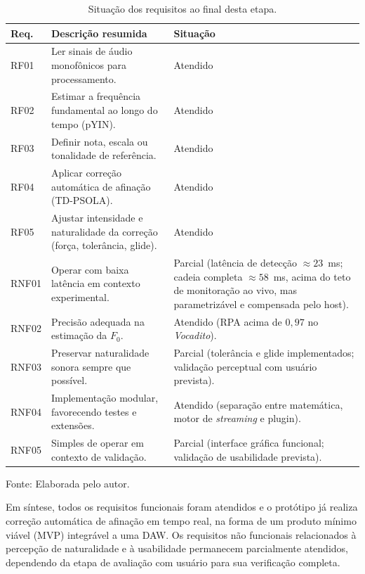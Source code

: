 \begin{table}[H]
\centering
\caption{\label{tab:requisitos_atingidos}Situação dos requisitos ao final desta etapa.}
\small
\begin{tabular}{|p{1.6cm}|p{8.4cm}|p{3.4cm}|}
\hline
\textbf{Req.} & \textbf{Descrição resumida} & \textbf{Situação} \\
\hline
RF01 & Ler sinais de áudio monofônicos para processamento. & Atendido \\
\hline
RF02 & Estimar a frequência fundamental ao longo do tempo (pYIN). & Atendido \\
\hline
RF03 & Definir nota, escala ou tonalidade de referência. & Atendido \\
\hline
RF04 & Aplicar correção automática de afinação (TD-PSOLA). & Atendido \\
\hline
RF05 & Ajustar intensidade e naturalidade da correção (força, tolerância, glide). & Atendido \\
\hline
RNF01 & Operar com baixa latência em contexto experimental. & Parcial (latência de detecção $\approx 23$~ms; cadeia completa $\approx 58$~ms, acima do teto de monitoração ao vivo, mas parametrizável e compensada pelo host). \\
\hline
RNF02 & Precisão adequada na estimação da $F_0$. & Atendido (RPA acima de $0{,}97$ no \textit{Vocadito}). \\
\hline
RNF03 & Preservar naturalidade sonora sempre que possível. & Parcial (tolerância e glide implementados; validação perceptual com usuário prevista). \\
\hline
RNF04 & Implementação modular, favorecendo testes e extensões. & Atendido (separação entre matemática, motor de \textit{streaming} e plugin). \\
\hline
RNF05 & Simples de operar em contexto de validação. & Parcial (interface gráfica funcional; validação de usabilidade prevista). \\
\hline
\end{tabular}
\small Fonte: Elaborada pelo autor.
\end{table}

Em síntese, todos os requisitos funcionais foram atendidos e o protótipo já
realiza correção automática de afinação em tempo real, na forma de um produto
mínimo viável (MVP) integrável a uma DAW. Os requisitos não funcionais
relacionados à percepção de naturalidade e à usabilidade permanecem parcialmente
atendidos, dependendo da etapa de avaliação com usuário para sua verificação
completa.

